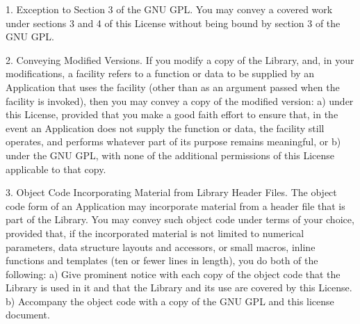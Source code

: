 \documentclass {book}
\begin{document}
\begin{tiny}
1. Exception to Section 3 of the GNU GPL. You may convey a covered work under sections 3 and 4 of this License without being bound by section 3 of the GNU GPL.

2. Conveying Modified Versions. If you modify a copy of the Library, and, in your modifications, a facility refers to a function or data to be supplied by an Application that uses the facility (other than as an argument passed when the facility is invoked), then you may convey a copy of the modified version: a) under this License, provided that you make a good faith effort to ensure that, in the event an Application does not supply the function or data, the facility still operates, and performs whatever part of its purpose remains meaningful, or b) under the GNU GPL, with none of the additional permissions of this License applicable to that copy.

3. Object Code Incorporating Material from Library Header Files. The object code form of an Application may incorporate material from a header file that is part of the Library. You may convey such object code under terms of your choice, provided that, if the incorporated material is not limited to numerical parameters, data structure layouts and accessors, or small macros, inline functions and templates (ten or fewer lines in length), you do both of the following: a) Give prominent notice with each copy of the object code that the Library is used in it and that the Library and its use are covered by this License. b) Accompany the object code with a copy of the GNU GPL and this license document.


\end{tiny}
\end{document}
